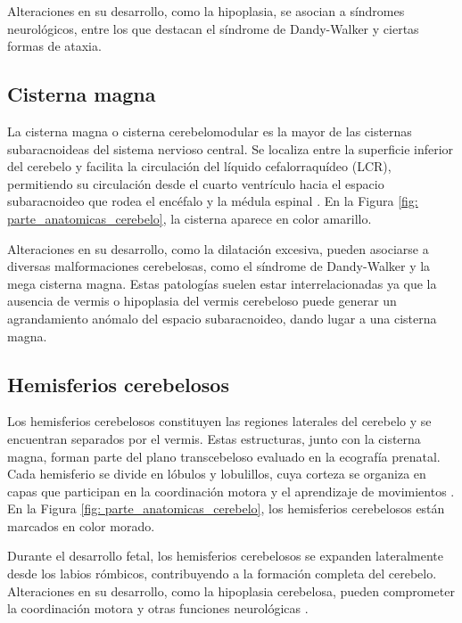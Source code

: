 Alteraciones en su desarrollo, como la hipoplasia, se asocian a síndromes neurológicos, entre los que destacan el síndrome de Dandy-Walker \cite{dandy2023} y ciertas formas de ataxia.

\subsection{Cisterna magna}
La cisterna magna o cisterna cerebelomodular es la mayor de las cisternas subaracnoideas del sistema nervioso central. Se localiza entre la superficie inferior del cerebelo y facilita la circulación del líquido cefalorraquídeo (LCR), permitiendo su circulación desde el cuarto ventrículo hacia el espacio subaracnoideo que rodea el encéfalo y la médula espinal \cite{patel2023cisternamagna}. En la Figura \ref{fig: parte_anatomicas_cerebelo}, la cisterna aparece en color amarillo.

Alteraciones en su desarrollo, como la dilatación excesiva, pueden asociarse a diversas malformaciones cerebelosas, como el síndrome de Dandy-Walker y la mega cisterna magna. Estas patologías suelen estar interrelacionadas ya que la ausencia de vermis o hipoplasia del vermis cerebeloso puede generar un agrandamiento anómalo del espacio subaracnoideo, dando lugar a una cisterna magna.\cite{patel2023cisternamagna}
\subsection{Hemisferios cerebelosos}
Los hemisferios cerebelosos constituyen las regiones laterales del cerebelo y se encuentran separados por el vermis. Estas estructuras, junto con la cisterna magna,
forman parte del plano transcebeloso evaluado en la ecografía prenatal. Cada
hemisferio se divide en lóbulos y lobulillos, cuya corteza se organiza en capas
que participan en la coordinación motora y el aprendizaje de movimientos \cite{kenhub}. En la Figura \ref{fig: parte_anatomicas_cerebelo}, los hemisferios cerebelosos están marcados en color morado.


Durante el desarrollo fetal, los hemisferios cerebelosos se expanden lateralmente desde los labios rómbicos, contribuyendo a la formación completa del cerebelo. Alteraciones en su desarrollo, como la hipoplasia cerebelosa, pueden comprometer la coordinación motora y otras funciones neurológicas \cite{volpecerebelo}.

